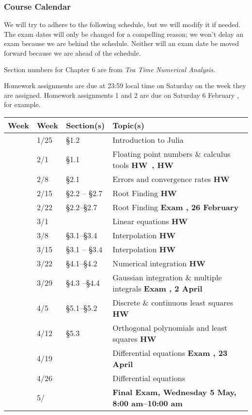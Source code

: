 \documentclass[12pt,fullpage]{article}
\newcounter{qz}\setcounter{qz}{0}
\newcommand{\qz}{%
\setcounter{qz}{\value{qz}+1}
\textbf{ \theqz} \,}
\newcounter{ex}\setcounter{ex}{0}
\newcommand{\ex}{%
\setcounter{ex}{\value{ex}+1}
Exam \theex}
\newcounter{wk}\setcounter{wk}{0}
\newcommand{\wk}{%
\setcounter{wk}{\value{wk}+1}
\thewk \,\,}
\begin{document}
\newpage

\subsubsection*{Course Calendar}

We will try to adhere to the following schedule, but we will modify it
if needed. The exam dates will only be changed for a compelling
reason; we won't delay an exam because we are behind the
schedule. Neither will an exam date be moved forward because we are
ahead of the schedule.

Section numbers for Chapter 6 are from \emph{Tea Time Numerical Analysis.}  

Homework assignments are due at 23:59 local time on Saturday on the week they are assigned. Homework assignments 1 and 2 are due on Saturday 6 February \the\year, for example.

\vspace{0.1in}

\begin{center}

\begin{tabular}  {|l|l|l|l|}
\hline
{\bf Week}  & {\bf Week} &  {\bf Section(s)} & {\bf Topic(s)} \\
\hline \hline 
\wk    & 1/25 &    \S1.2   &   Introduction to Julia   \hfill \\
\wk    & 2/1 & \S1.1      &  Floating point numbers \& calculus tools   \hfill \textbf{HW  \qz,  HW \qz} \\
\wk    & 2/8 &    \S2.1 & Errors and convergence rates    \hfill \textbf{HW  \qz} \\
\wk    & 2/15  & \S2.2 -- \S2.7 &  Root Finding   \hfill  \textbf{HW \qz} \\
\wk    & 2/22 &  \S2.2--\S2.7   &  Root Finding    \hfill \textbf{\ex\-\-, 26 February}   \\
\wk    & 3/1    &  &  Linear equations  \hfill  \textbf{HW  \qz }  \\
\wk    & 3/8     & \S3.1--\S3.4 & Interpolation \hfill \textbf{ HW  \qz }   \\
\wk   & 3/15   & \S3.1 -- \S3.4   &   Interpolation   \hfill \textbf{ HW  \qz} \\
\wk  &  3/22    & \S4.1--\S4.2 &  Numerical  integration  \hfill \textbf{HW  \qz}     \hfill \\
\wk &  3/29     &   \S4.3 --\S4.4 &   Gaussian integration \& multiple integrals    \hfill \textbf{\ex\-\-, 2 April}  \\
\wk  & 4/5 &   \S5.1--\S5.2 & Discrete \& continuous least squares  \hfill \textbf{HW    \qz} \\
\wk   & 4/12  & \S5.3 &  Orthogonal polynomials and least squares  \hfill \textbf{HW \qz}   \\
\wk   & 4/19   &   & Differential equations \hfill  \textbf{ \ex, 23 April}     \\
\wk   & 4/26   &     & Differential equations   \hfill \\
\wk   & 5/       &  &   \textbf{Final Exam, Wednesday 5 May, 8:00 am--10:00 am} \\ \hline
\end{tabular}
\end{center}
\end{document}
